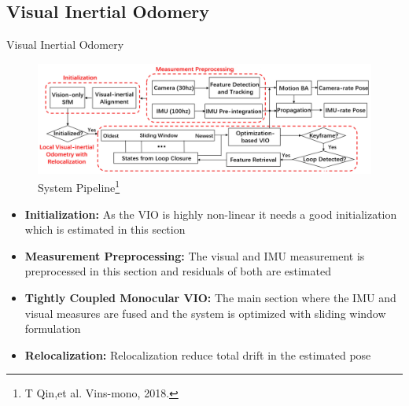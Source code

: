 \documentclass[10pt]{beamer}
\begin{document}
\subsection*{Visual Inertial Odomery}
\begin{frame}{Visual Inertial Odomery}
    \vspace{-0.2cm}
    \begin{figure}[h!]
        \centering
        \includegraphics[scale=0.15]{VINS-mono-architecture.png}
        \caption{System Pipeline\footnote{T Qin,et al. Vins-mono, 2018.}}
        \label{Fig:System_Pipeline}
    \end{figure}
    \vspace{-0.6cm}
    \begin{itemize}
        \item \textbf{Initialization:} As the VIO is highly non-linear it needs a good initialization which is estimated in this section
              \pause
        \item \textbf{Measurement Preprocessing:} The visual and IMU measurement is preprocessed in this section and residuals of both are estimated
              \pause
        \item \textbf{Tightly Coupled Monocular VIO:} The main section where the IMU and visual measures are fused and the system is optimized with sliding window formulation
              \pause
        \item \textbf{Relocalization:} Relocalization reduce total drift in the estimated pose
    \end{itemize}
\end{frame}
\end{document}
